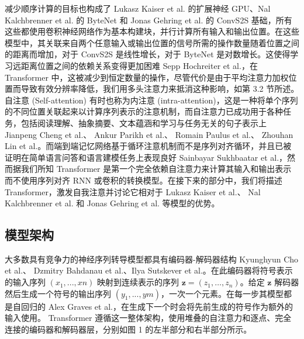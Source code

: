 减少顺序计算的目标也构成了 Lukasz Kaiser et al. 的扩展神经 GPU、Nal Kalchbrenner et al. 的 ByteNet 和 Jonas Gehring et al. 的 ConvS2S 基础，所有这些都使用卷积神经网络作为基本构建块，并行计算所有输入和输出位置。在这些模型中，其关联来自两个任意输入或输出位置的信号所需的操作数量随着位置之间的距离而增加，对于 ConvS2S 是线性增长，对于 ByteNet 是对数增长。这使得学习远距离位置之间的依赖关系变得更加困难 Sepp Hochreiter et al.，在 Transformer 中，这被减少到恒定数量的操作，尽管代价是由于平均注意力加权位置而导致有效分辨率降低，我们用多头注意力来抵消这种影响，如第 3.2 节所述。自注意 (Self-attention) 有时也称为内注意 (intra-attention)，这是一种将单个序列的不同位置关联起来以计算序列表示的注意机制，而自注意力已成功用于各种任务，包括阅读理解、抽象摘要、文本蕴涵和学习与任务无关的句子表示上 Jianpeng Cheng et al.、 Ankur Parikh et al.、 Romain Paulus et al.、 Zhouhan Lin et al.。而端到端记忆网络基于循环注意机制而不是序列对齐循环，并且已被证明在简单语言问答和语言建模任务上表现良好 Sainbayar Sukhbaatar et al.，然而据我们所知 Transformer 是第一个完全依赖自注意力来计算其输入和输出表示而不使用序列对齐 RNN 或卷积的转换模型。在接下来的部分中，我们将描述 Transformer，激发自我注意并讨论它相对于 Lukasz Kaiser et al.、 Nal Kalchbrenner et al. 和 Jonas Gehring et al. 等模型的优势。

\subsection{模型架构}

大多数具有竞争力的神经序列转导模型都具有编码器-解码器结构 Kyunghyun Cho et al.、 Dzmitry Bahdanau et al.、Ilya Sutskever et al.。在此编码器将符号表示的输入序列 $(x_{1}, ..., x{n})$ 映射到连续表示的序列 $\mathbf{z}=\left(z_{1}, \ldots, z_{n}\right)$。给定 $\mathbf{z}$ 解码器然后生成一个符号的输出序列 $(y_{1}, ..., y{m})$，一次一个元素。在每一步其模型都是自回归的 Alex Graves et al.，在生成下一个时会将先前生成的符号作为额外的输入使用。 Transformer 遵循这一整体架构，使用堆叠的自注意力和逐点、完全连接的编码器和解码器层，分别如图 1 的左半部分和右半部分所示。

